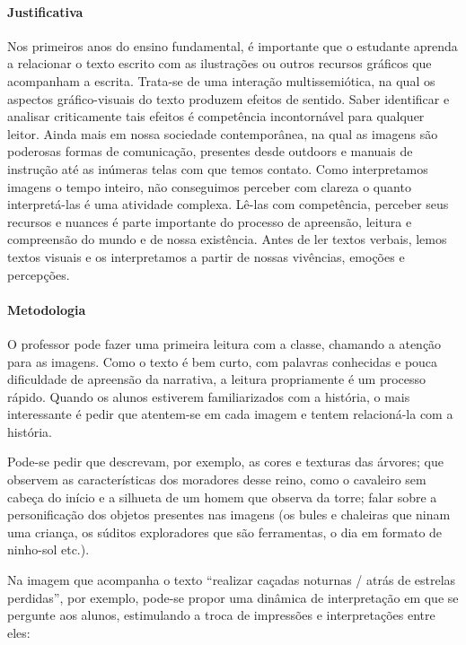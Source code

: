\documentclass[11pt]{extarticle}
\begin{document}
\paragraph{Justificativa} Nos primeiros anos do ensino fundamental, é importante que o estudante aprenda a relacionar o texto escrito com as ilustrações ou outros recursos gráficos que acompanham a escrita. Trata-se de uma interação multissemiótica, na qual os aspectos gráfico-visuais do texto produzem efeitos de sentido. Saber identificar e analisar criticamente tais efeitos é competência incontornável para qualquer leitor. Ainda mais em nossa sociedade contemporânea, na qual as imagens são poderosas formas de comunicação, 
presentes desde outdoors e manuais de instrução até as inúmeras telas com que temos contato. Como interpretamos imagens o tempo inteiro, não conseguimos perceber com clareza o quanto interpretá-las é uma atividade complexa. Lê-las com competência, 
perceber seus recursos e nuances é parte importante do processo de apreensão, 
leitura e compreensão do mundo e de nossa existência. Antes de ler textos 
verbais, lemos textos visuais e os interpretamos a partir de nossas vivências, 
emoções e percepções.



\paragraph{Metodologia} O professor pode fazer uma primeira leitura com a classe, chamando a atenção para as imagens. Como o texto é bem curto, com palavras conhecidas e pouca dificuldade de apreensão da narrativa, a leitura propriamente é um processo rápido. Quando os alunos estiverem familiarizados com a história, o mais interessante é pedir que atentem-se em cada imagem e tentem relacioná-la com a história.

Pode-se pedir que descrevam, por exemplo, as cores e texturas das árvores; que observem as características dos moradores desse reino, como o cavaleiro sem cabeça do início e a silhueta de um homem que observa da torre; falar sobre a personificação dos objetos presentes nas imagens (os bules e chaleiras que ninam uma criança, os súditos exploradores que são ferramentas, o dia em formato de ninho-sol etc.).

Na imagem que acompanha o texto ``realizar caçadas noturnas / atrás de estrelas perdidas'', por exemplo, pode-se propor uma dinâmica de interpretação em que se pergunte aos alunos, estimulando a troca de impressões e interpretações entre eles:
\end{document}
